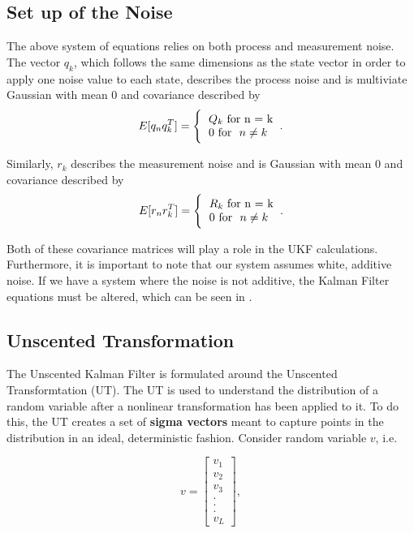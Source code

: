 \documentclass{article}
\begin{document}
    \subsection{Set up of the Noise}
    The above system of equations relies on both process and measurement noise. The vector $q_k$, which follows the same dimensions as the state vector in order to apply one noise value to each state, describes the process noise and is multiviate Gaussian with mean 0 and covariance described by \cite{SimonHaykinText}
    \begin{equation}
    E[q_{n}q_{k}^T] = \Bigg\{\begin{tabular}{l}
    $Q_k$\ for\ n = k  \\
    0   for \ $n \neq k$
    \end{tabular}.
    \end{equation}
    
    Similarly, $r_k$ describes the measurement noise and is Gaussian with mean 0 and covariance described by \cite{SimonHaykinText}
    \begin{equation}
    E[r_{n}r_{k}^T] = \Bigg\{\begin{tabular}{l}
    $R_k$\ for\ n = k  \\
    0   for \ $n \neq k$
    \end{tabular}. 
    \end{equation}
    
    
    Both of these covariance matrices will play a role in the UKF calculations. Furthermore, it is important to note that our system assumes white, additive noise. If we have a system where the noise is not additive, the Kalman Filter equations must be altered, which can be seen in \cite{VanMereChapter}. 
    
    \subsection{Unscented Transformation}
    The Unscented Kalman Filter is formulated around the Unscented Transformtation (UT). The UT is used to understand the distribution of a random variable after a nonlinear transformation has been applied to it. To do this, the UT creates a set of \textbf{sigma vectors} meant to capture points in the distribution in an ideal, deterministic fashion. \cite{VanMereChapter} Consider random variable $v$, i.e.
    
    \begin{equation}
    v = \begin{bmatrix} v_1\\ v_2\\v_3\\.\\.\\.\\v_L\end{bmatrix},
    \end{equation}
    
\end{document}
